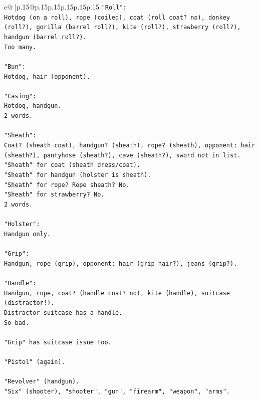 \documentclass{article}
\begin{document}
{\begin{supertabular}{c@{$\;$}|p{.15\linewidth}@{}p{.15\linewidth}p{.15\linewidth}p{.15\linewidth}p{.15\linewidth}p{.15\linewidth}}
{{{\texttt{"Roll":} \\
\texttt{Hotdog (on a roll), rope (coiled), coat (roll coat? no), donkey (roll?), gorilla (barrel roll?), kite (roll?), strawberry (roll?), handgun (barrel roll?).} \\
\texttt{Too many.} \\
\\ 
\texttt{"Bun":} \\
\texttt{Hotdog, hair (opponent).} \\
\\ 
\texttt{"Casing":} \\
\texttt{Hotdog, handgun.} \\
\texttt{2 words.} \\
\\ 
\texttt{"Sheath":} \\
\texttt{Coat? (sheath coat), handgun? (sheath), rope? (sheath), opponent: hair (sheath?), pantyhose (sheath?), cave (sheath?), sword not in list.} \\
\texttt{"Sheath" for coat (sheath dress/coat).} \\
\texttt{"Sheath" for handgun (holster is sheath).} \\
\texttt{"Sheath" for rope? Rope sheath? No.} \\
\texttt{"Sheath" for strawberry? No.} \\
\texttt{2 words.} \\
\\ 
\texttt{"Holster":} \\
\texttt{Handgun only.} \\
\\ 
\texttt{"Grip":} \\
\texttt{Handgun, rope (grip), opponent: hair (grip hair?), jeans (grip?).} \\
\\ 
\texttt{"Handle":} \\
\texttt{Handgun, rope, coat? (handle coat? no), kite (handle), suitcase (distractor!).} \\
\texttt{Distractor suitcase has a handle.} \\
\texttt{So bad.} \\
\\ 
\texttt{"Grip" has suitcase issue too.} \\
\\ 
\texttt{"Pistol" (again).} \\
\\ 
\texttt{"Revolver" (handgun).} \\
\texttt{"Six" (shooter), "shooter", "gun", "firearm", "weapon", "arms".} \\
}}}
\end{supertabular}}
\end{document}
